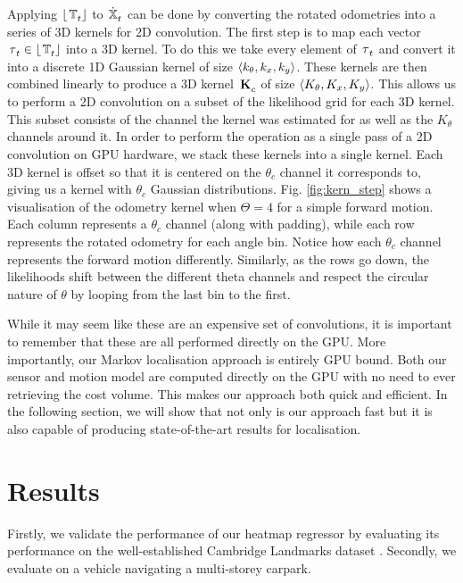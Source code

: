 \documentclass[letterpaper, 10 pt, conference]{ieeeconf}  %
\begin{document}
Applying \ensuremath{\lfloor\set{}{}{T}{t}{}\rfloor} to \ensuremath{\poseSet{\mytime}{}} can be done by converting the rotated odometries into a series of 3D kernels for 2D convolution.
The first step is to map each vector \ensuremath{\vtr{}{}{\tau}{t}{} \in \lfloor\set{}{}{T}{t}{}\rfloor} into a 3D kernel.
To do this we take every element of \ensuremath{\vtr{}{}{\tau}{t}{}} and convert it into a discrete 1D Gaussian kernel of size \ensuremath{\mytuple{k_\theta, k_x, k_y}}.
These kernels are then combined linearly to produce a 3D kernel \ensuremath{\mat{}{}{K}{c}{}} of size \ensuremath{\mytuple{K_\theta, K_x, K_y}}.
This allows us to perform a 2D convolution on a subset of the likelihood grid for each 3D kernel.
This subset consists of the channel the kernel was estimated for as well as the \ensuremath{K_\theta} channels around it.
In order to perform the operation as a single pass of a 2D convolution on GPU hardware, we stack these kernels into a single kernel.
Each 3D kernel is offset so that it is centered on the \ensuremath{\theta_c} channel it corresponds to, giving us a kernel with \ensuremath{\theta_c} Gaussian distributions.
Fig. \ref{fig:kern_step} shows a visualisation of the odometry kernel when \ensuremath{\Theta=4} for a simple forward motion.
Each column represents a \ensuremath{\theta_c} channel (along with padding), while each row represents the rotated odometry for each angle bin. 
Notice how each \ensuremath{\theta_c} channel represents the forward motion differently. 
Similarly, as the rows go down, the likelihoods shift between the different theta channels and respect the circular nature of \ensuremath{\theta} by looping from the last bin to the first. 

While it may seem like these are an expensive set of convolutions, it is important to remember that these are all performed directly on the GPU.
More importantly, our Markov localisation approach is entirely GPU bound. 
Both our sensor and motion model are computed directly on the GPU with no need to ever retrieving the cost volume.
This makes our approach both quick and efficient.
In the following section, we will show that not only is our approach fast but it is also capable of producing state-of-the-art results for localisation.
\vspace{-0.125cm}
\section{Results}

Firstly, we validate the performance of our heatmap regressor by evaluating its performance on the well-established Cambridge Landmarks dataset
\cite{Kendall2015Posenet}.
Secondly, we evaluate on a vehicle navigating a multi-storey carpark.
\end{document}
